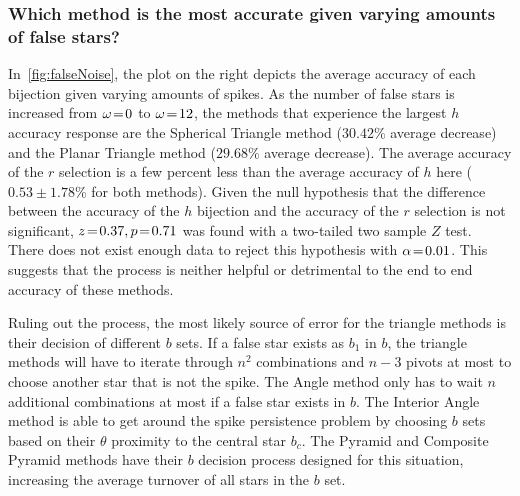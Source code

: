 \documentclass[conference]{IEEEtran}
\begin{document}
    \subsubsection{Which method is the most accurate given varying amounts of false stars?}
    In~\autoref{fig:falseNoise}, the plot on the right depicts the average accuracy of each bijection given varying amounts
    of spikes.
    As the number of false stars is increased from $\omega \!=\! 0$ to $\omega \!=\! 12$, the methods that experience the largest
    $h$ accuracy response are the Spherical Triangle method ($30.42\%$ average decrease) and the Planar Triangle method
    ($29.68\%$ average decrease).
    The average accuracy of the $r$ selection is a few percent less than the average accuracy of $h$ here
    ($0.53\!\pm\!1.78\%$ for both methods).
    Given the null hypothesis that the difference between the accuracy of the $h$ bijection and the accuracy of the $r$
    selection is not significant, $z \!=\! 0.37, p \!=\! 0.71$ was found with a two-tailed two sample $Z$ test.
    There does not exist enough data to reject this hypothesis with $\alpha \!=\! 0.01$.
    This suggests that the  process is neither helpful or detrimental to the end to end accuracy of these
    methods.

    Ruling out the  process, the most likely source of error for the triangle methods is their decision of
    different $b$ sets.
    If a false star exists as $b_1$ in $b$, the triangle methods will have to iterate through $n^2$ combinations and $n - 3$
    pivots at most to choose another star that is not the spike.
    The Angle method only has to wait $n$ additional combinations at most if a false star exists in $b$.
    The Interior Angle method is able to get around the spike persistence problem by choosing $b$ sets based on their
    $\theta$ proximity to the central star $b_c$.
    The Pyramid and Composite Pyramid methods have their $b$ decision process designed for this situation, increasing the
    average turnover of all stars in the $b$ set.
\end{document}
